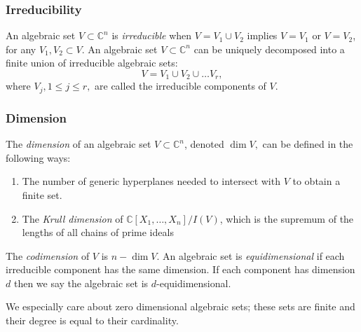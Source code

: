 \documentclass[a4paper]{article}
\def\C{\mathbb{C}}
\begin{document}
\subsubsection{Irreducibility}
An algebraic set $V \subset \C^n$ is \textit{irreducible} when $V = V_1 \cup V_2$ implies $V=V_1$  or $V=V_2$, for any $V_1,V_2 \subset V$. An algebraic set $V \subset \C^n$ can be uniquely decomposed into a finite union of irreducible algebraic sets:
\[
V = V_1 \cup V_2 \cup \hdots V_r,
\]
where $V_j, 1\leq j \leq r,$ are called the irreducible
components of $V$.
\subsubsection{Dimension}
The \textit{dimension} of an algebraic set $V \subset \C^n$, denoted $\dim V,$ can be defined in the following ways:
\begin{enumerate}
    \item The number of generic hyperplanes needed to intersect with $V$ to obtain a finite set. 
    \item The \textit{Krull dimension} of $\C[X_1,\hdots,X_n]/I(V)$, which is the supremum of the lengths of all chains of prime ideals
\end{enumerate}
The \textit{codimension} of $V$ is $n - \dim V$. An algebraic set is \textit{equidimensional} if each irreducible component has the same dimension.  If each component has dimension $d$ then we say the algebraic set is $d$-equidimensional.
\par
We especially care about zero dimensional algebraic sets; these sets are finite and their degree is equal to their cardinality. 


\end{document}
